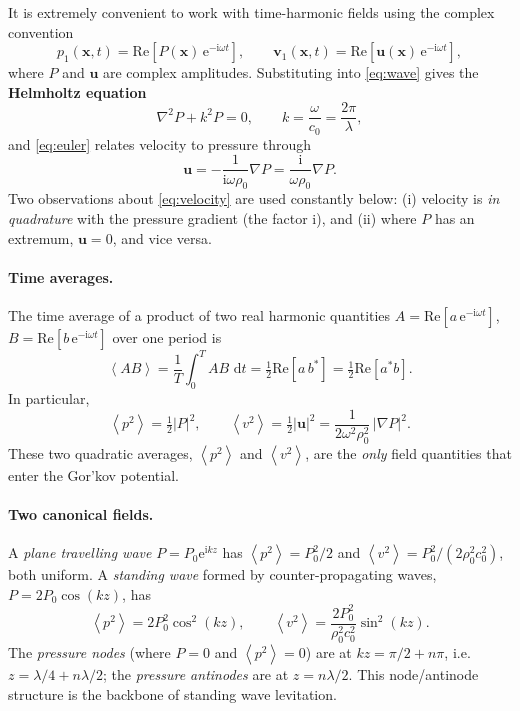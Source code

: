 \documentclass[11pt]{article}
\newcommand{\rrho}{\rho_{0}}
\newcommand{\cc}{c_{0}}
\newcommand{\avg}[1]{\left\langle #1 \right\rangle}
\newcommand{\vpSq}{\avg{p^{2}}}
\newcommand{\vvSq}{\avg{v^{2}}}
\newcommand{\dd}{\,\mathrm{d}}
\newcommand{\ee}{\mathrm{e}}
\newcommand{\ii}{\mathrm{i}}
\newcommand{\uu}{\mathbf{u}}
\newcommand{\vv}{\mathbf{v}}
\newcommand{\xx}{\mathbf{x}}
\begin{document}
It is extremely convenient to work with time-harmonic fields using the complex
convention
\begin{equation}
  p_{1}(\xx,t)=\mathrm{Re}\!\left[ P(\xx)\,\ee^{-\ii\omega t}\right],
  \qquad
  \vv_{1}(\xx,t)=\mathrm{Re}\!\left[ \uu(\xx)\,\ee^{-\ii\omega t}\right],
  \label{eq:harmonic}
\end{equation}
where $P$ and $\uu$ are complex amplitudes. Substituting into \eqref{eq:wave}
gives the \textbf{Helmholtz equation}
\begin{equation}
  \nabla^{2}P+k^{2}P=0,\qquad k=\frac{\omega}{\cc}=\frac{2\pi}{\lambda},
  \label{eq:helmholtz}
\end{equation}
and \eqref{eq:euler} relates velocity to pressure through
\begin{equation}
  \uu=-\frac{1}{\ii\omega\rrho}\nabla P
      =\frac{\ii}{\omega\rrho}\nabla P.
  \label{eq:velocity}
\end{equation}
Two observations about \eqref{eq:velocity} are used constantly below:
(i) velocity is \emph{in quadrature} with the pressure gradient (the factor
$\ii$), and (ii) where $P$ has an extremum, $\uu=0$, and vice versa.

\paragraph{Time averages.} The time average of a product of two real harmonic
quantities $A=\mathrm{Re}[a\,\ee^{-\ii\omega t}]$,
$B=\mathrm{Re}[b\,\ee^{-\ii\omega t}]$ over one period is
\begin{equation}
  \avg{AB}=\frac{1}{T}\int_{0}^{T}AB\,\dd t
          =\tfrac{1}{2}\mathrm{Re}\!\left[a\,b^{*}\right]
          =\tfrac{1}{2}\mathrm{Re}\!\left[a^{*}b\right].
  \label{eq:timeavg}
\end{equation}
In particular,
\begin{equation}
  \vpSq=\tfrac{1}{2}|P|^{2},\qquad
  \vvSq=\tfrac{1}{2}|\uu|^{2}
       =\frac{1}{2\omega^{2}\rrho^{2}}\,|\nabla P|^{2}.
  \label{eq:pvmeansq}
\end{equation}
These two quadratic averages, $\vpSq$ and $\vvSq$, are the \emph{only} field
quantities that enter the Gor'kov potential.

\paragraph{Two canonical fields.} A \emph{plane travelling wave}
$P=P_{0}\ee^{\ii kz}$ has $\vpSq=P_{0}^{2}/2$ and
$\vvSq=P_{0}^{2}/(2\rrho^{2}\cc^{2})$, both uniform. A \emph{standing wave}
formed by counter-propagating waves,
$P=2P_{0}\cos(kz)$, has
\begin{equation}
  \vpSq=2P_{0}^{2}\cos^{2}(kz),\qquad
  \vvSq=\frac{2P_{0}^{2}}{\rrho^{2}\cc^{2}}\sin^{2}(kz).
  \label{eq:standing}
\end{equation}
The \emph{pressure nodes} (where $P=0$ and $\vpSq=0$) are at
$kz=\pi/2+n\pi$, i.e.\ $z=\lambda/4+n\lambda/2$; the \emph{pressure antinodes}
are at $z=n\lambda/2$. This node/antinode structure is the backbone of standing
wave levitation.
\end{document}
